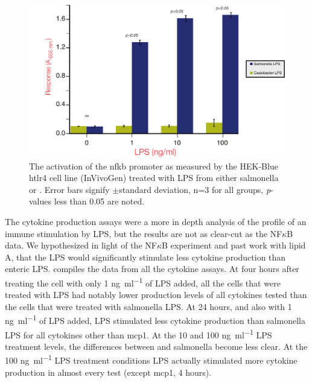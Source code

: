 \begin{figure}[htb]
  \begin{center}
    \includegraphics[width=\textwidth]{lps_chapter/img/NFkBAssay.pdf}
  \end{center}
  \caption[\ac{nfkb} Assay for cellular activation by \ac{LPS}]{
    The activation of the \ac{nfkb} promoter as measured by the HEK-Blue h\ac{tlr4}\texttrademark{} cell line (InVivoGen) treated with \ac{LPS} from either \ac{salmonella} or \caulobacter{}. Error bars signify $\pm{}$standard deviation, n=3 for all groups, \textit{p}-values less than 0.05 are noted.  }
  \label{fig:nfkbassay}
\end{figure}    

The cytokine production assays were a more in depth analysis of the profile of
an immune stimulation by \caulobacter{} \ac{LPS}, but the results are not as
clear-cut as the NF$\kappa$B data. We hypothesized in light of the NF$\kappa$B experiment and past work with lipid A, that the \caulobacter \ac{LPS} would significantly  stimulate less cytokine production than enteric \ac{LPS}.  compiles the data from all the cytokine assays. At four hours after treating the cell with only 1 \si{\nano\gram\per\milli\litre} of \ac{LPS} added, all the cells that were treated with \caulobacter{} \ac{LPS} had notably lower production levels of all cytokines tested than the cells that were treated with \ac{salmonella} \ac{LPS}. At 24 hours, and also with 1 \si{\nano\gram\per\milli\litre} of \ac{LPS} added, \caulobacter{} \ac{LPS} stimulated less cytokine production than \ac{salmonella} \ac{LPS} for all cytokines other than \ac{mcp1}. At the 10 and 100 \si{\nano\gram\per\milli\litre} \ac{LPS} treatment levels, the differences between \caulobacter{} and \ac{salmonella} become less clear. At the 100 \si{\nano\gram\per\milli\litre} \ac{LPS} treatment conditions \caulobacter{} \ac{LPS} actually stimulated more cytokine production in almost every test (except \ac{mcp1}, 4 hours). 

